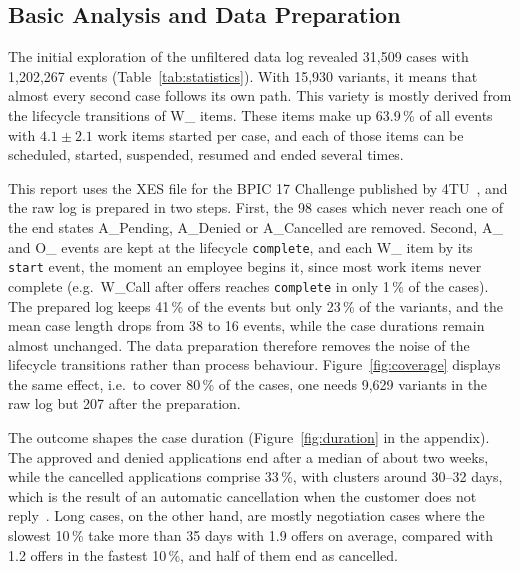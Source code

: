 \documentclass[
  english,        %
  font=times,     %
  twocolumn,      %
]{tumarticle}
\begin{document}
\subsection{Basic Analysis and Data Preparation}\label{sec:basic}
The initial exploration of the unfiltered data log revealed 31,509 cases with 1,202,267 events (Table~\ref{tab:statistics}). With 15,930 variants, it means that almost every second case follows its own path. This variety is mostly derived from the lifecycle transitions of W\_ items. These items make up 63.9\,\% of all events with $4.1 \pm 2.1$ work items started per case, and each of those items can be scheduled, started, suspended, resumed and ended several times.

This report uses the XES file for the BPIC 17 Challenge published by 4TU~\cite{bpic17_data}, and the raw log is prepared in two steps. First, the 98 cases which never reach one of the end states A\_Pending, A\_Denied or A\_Cancelled are removed. Second, A\_ and O\_ events are kept at the lifecycle \texttt{complete}, and each W\_ item by its \texttt{start} event, the moment an employee begins it, since most work items never complete (e.g.\ W\_Call after offers reaches \texttt{complete} in only 1\,\% of the cases). The prepared log keeps 41\,\% of the events but only 23\,\% of the variants, and the mean case length drops from 38 to 16 events, while the case durations remain almost unchanged. The data preparation therefore removes the noise of the lifecycle transitions rather than process behaviour. Figure~\ref{fig:coverage} displays the same effect, i.e.\ to cover 80\,\% of the cases, one needs 9,629 variants in the raw log but 207 after the preparation. 

The outcome shapes the case duration (Figure~\ref{fig:duration} in the appendix). The approved and denied applications end after a median of about two weeks, while the cancelled applications comprise 33\,\%, with clusters around 30--32 days, which is the result of an automatic cancellation when the customer does not reply~\cite{smith2017axis,povalyaeva2017density}. Long cases, on the other hand, are mostly negotiation cases where the slowest 10\,\% take more than 35 days with 1.9 offers on average, compared with 1.2 offers in the fastest 10\,\%, and half of them end as cancelled. 
\end{document}

